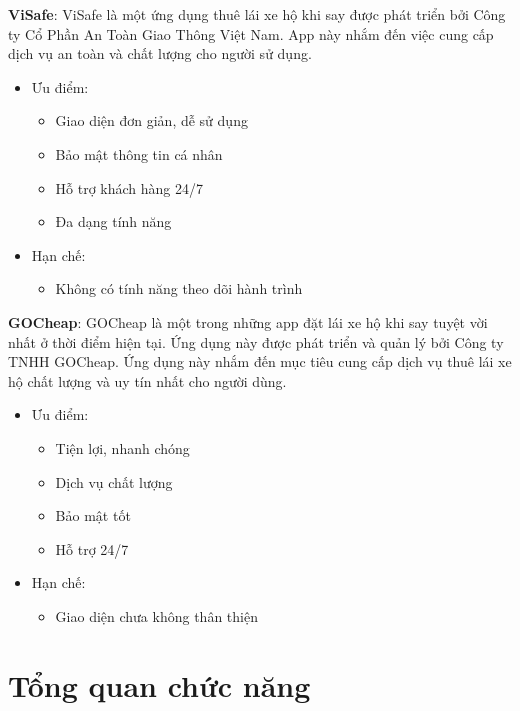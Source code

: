 \documentclass[../DoAn.tex]{subfiles}
\begin{document}
\textbf{ViSafe}: ViSafe là một ứng dụng thuê lái xe hộ khi say được phát triển bởi Công ty Cổ Phần An Toàn Giao Thông Việt Nam. App này nhắm đến việc cung cấp dịch vụ an toàn và chất lượng cho người sử dụng.
\begin{itemize}
    \item Ưu điểm:
      \begin{itemize}
        \item Giao diện đơn giản, dễ sử dụng
        \item Bảo mật thông tin cá nhân
        \item Hỗ trợ khách hàng 24/7
        \item Đa dạng tính năng
      \end{itemize}
    \item Hạn chế:
      \begin{itemize}
        \item Không có tính năng theo dõi hành trình
      \end{itemize}
\end{itemize}

\textbf{GOCheap}: GOCheap là một trong những app đặt lái xe hộ khi say tuyệt vời nhất ở thời điểm hiện tại. Ứng dụng này được phát triển và quản lý bởi Công ty TNHH GOCheap. Ứng dụng này nhắm đến mục tiêu cung cấp dịch vụ thuê lái xe hộ chất lượng và uy tín nhất cho người dùng.
\begin{itemize}
    \item Ưu điểm:
      \begin{itemize}
        \item Tiện lợi, nhanh chóng
        \item Dịch vụ chất lượng
        \item Bảo mật tốt
        \item Hỗ trợ 24/7
      \end{itemize}
    \item Hạn chế:
      \begin{itemize}
        \item Giao diện chưa không thân thiện
      \end{itemize}
\end{itemize}


\section{Tổng quan chức năng}
\label{section:2.2}
\end{document}
